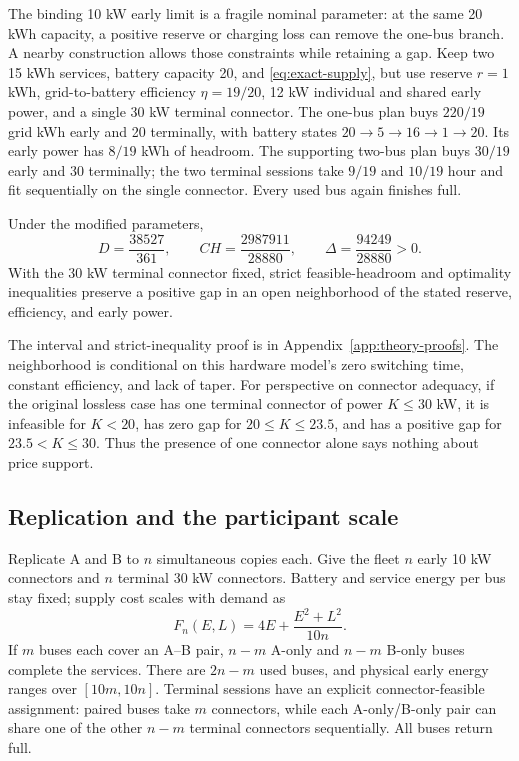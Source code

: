 The binding 10 kW early limit is a fragile nominal parameter: at the same
20 kWh capacity, a positive reserve or charging loss can remove the
one-bus branch.  A nearby construction allows those constraints while
retaining a gap.  Keep two 15 kWh services, battery capacity 20, and
\eqref{eq:exact-supply}, but use reserve $r=1$ kWh, grid-to-battery
efficiency $\eta=19/20$, 12 kW individual and shared early power, and a
single 30 kW terminal connector.  The one-bus plan buys $220/19$ grid kWh
early and 20 terminally, with battery states
$20\to5\to16\to1\to20$.  Its early power has $8/19$ kWh of headroom.
The supporting two-bus plan buys $30/19$ early and 30 terminally; the two
terminal sessions take $9/19$ and $10/19$ hour and fit sequentially on the
single connector.  Every used bus again finishes full.

\begin{proposition}\label{prop:exact-robust}
Under the modified parameters,
\begin{equation}\label{eq:exact-robust}
 D=\frac{38527}{361},\qquad
 CH=\frac{2987911}{28880},\qquad
 \Delta=\frac{94249}{28880}>0.
\end{equation}
With the 30 kW terminal connector fixed, strict feasible-headroom and
optimality inequalities preserve a positive gap in an open neighborhood
of the stated reserve, efficiency, and early power.
\end{proposition}

The interval and strict-inequality proof is in
Appendix~\ref{app:theory-proofs}.  The neighborhood is conditional on this
hardware model's zero switching time, constant efficiency, and lack of
taper.  For perspective on connector adequacy, if the original lossless
case has one terminal connector of power $K\leq30$ kW, it is infeasible for
$K<20$, has zero gap for $20\leq K\leq23.5$, and has a positive gap for
$23.5<K\leq30$.  Thus the presence of one connector alone says nothing
about price support.

\subsection{Replication and the participant scale}\label{sec:exact-replication}

Replicate A and B to $n$ simultaneous copies each.  Give the fleet $n$
early 10 kW connectors and $n$ terminal 30 kW connectors.  Battery and
service energy per bus stay fixed; supply cost scales with demand as
\begin{equation}\label{eq:exact-scaled-supply}
 F_n(E,L)=4E+\frac{E^2+L^2}{10n}.
\end{equation}
If $m$ buses each cover an A--B pair, $n-m$ A-only and $n-m$ B-only buses
complete the services.  There are $2n-m$ used buses, and physical early
energy ranges over $[10m,10n]$.  Terminal sessions have an explicit
connector-feasible assignment: paired buses take $m$ connectors, while
each A-only/B-only pair can share one of the other $n-m$ terminal
connectors sequentially.  All buses return full.

